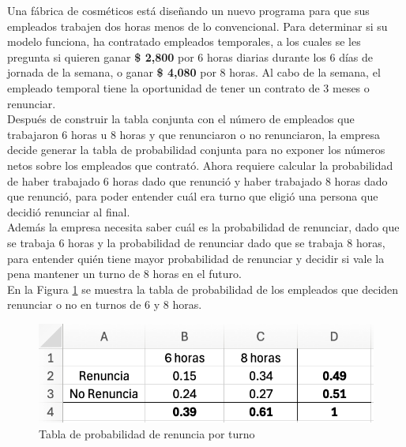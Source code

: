 \documentclass{article}
\begin{document}
Una fábrica de cosméticos está diseñando un nuevo programa para que sus empleados trabajen dos horas menos de lo convencional. Para determinar si su modelo funciona, ha contratado empleados temporales, a los cuales se les pregunta si quieren ganar \textbf{\$ 2,800} por 6 horas diarias durante los 6 días de jornada de la semana, o ganar \textbf{\$ 4,080} por 8 horas. Al cabo de la semana, el empleado temporal tiene la oportunidad de tener un contrato de 3 meses o renunciar.
\\[12pt]
Después de construir la tabla conjunta con el número de empleados que trabajaron 6 horas u 8 horas y que renunciaron o no renunciaron, la empresa decide generar la tabla de probabilidad conjunta para no exponer los números netos sobre los empleados que contrató. Ahora requiere calcular la probabilidad de haber trabajado 6 horas dado que renunció y haber trabajado 8 horas dado que renunció, para poder entender cuál era turno que eligió una persona que decidió renunciar al final.
\\[12pt]
Además la empresa necesita saber cuál es la probabilidad de renunciar, dado que se trabaja 6 horas y la probabilidad de renunciar dado que se trabaja 8 horas, para entender quién tiene mayor probabilidad de renunciar y decidir si vale la pena mantener un turno de 8 horas en el futuro.
\\[12pt]
En la Figura \ref{fig:p204} se muestra la tabla de probabilidad de los empleados que deciden renunciar o no en turnos de 6 y 8 horas.
\begin{figure}[!ht]
    \centering
    \begin{minipage}{\textwidth}
        \centering
        \includegraphics[width=\textwidth]{figures/p204.png}
    \end{minipage}
    \captionsetup{width=0.9\textwidth}
    \caption{Tabla de probabilidad de renuncia por turno}
    \label{fig:p204}
\end{figure}
\\
\end{document}
